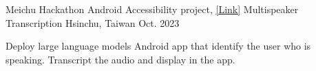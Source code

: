 \begin{cventries}

\cventry
    {Meichu Hackathon Android Accessibility project, \href{https://github.com/stanleyshen2003/multispeaker_transcription}{\underline{[Link]}}} 
    {Multispeaker Transcription} 
    {Hsinchu, Taiwan} 
    {Oct. 2023}
    {
      \begin{cvitems} %
        \item {Deploy large language models Android app that identify the user who is speaking. Transcript the audio and display in the app.}
      \end{cvitems}
    }

\end{cventries}
